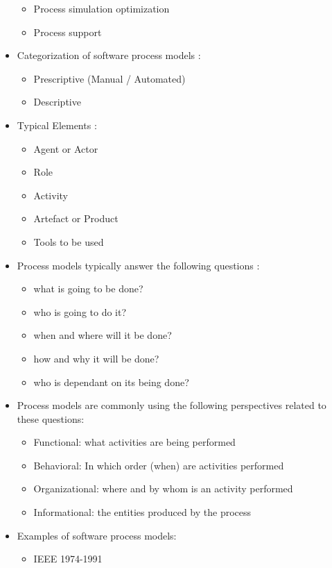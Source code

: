 \begin{itemize}
\begin{itemize}
		\item Process simulation  optimization
		\item Process support
	\end{itemize}
	\item Categorization of software process models \citep{McChesney:1995aa}:
	\begin{itemize}
		\item Prescriptive (Manual / Automated)
		\item Descriptive
	\end{itemize}
	\item Typical Elements \citep{Benali:1992gq} \citep{Acuna:2001aa} \citep{Fuggetta:2000ds} \citep{Curtis:1992kf}:
	\begin{itemize}
		\item Agent or Actor
		\item Role
		\item Activity
		\item Artefact or Product
		\item Tools to be used
	\end{itemize}
	\item Process models typically answer the following questions \citep{Curtis:1992kf}:
	\begin{itemize}
		\item what is going to be done?
		\item who is going to do it?
		\item when and where will it be done?
		\item how and why it will be done?
		\item who is dependant on its being done?
	\end{itemize}
	\item Process models are commonly using the following perspectives related to these questions:
	\begin{itemize}
		\item Functional: what activities are being performed
		\item Behavioral: In which order (when) are activities performed
		\item Organizational: where and by whom is an activity performed
		\item Informational: the entities produced by the process
	\end{itemize}
	\item Examples of software process models:
	\begin{itemize}
		\item IEEE 1974-1991

\end{itemize}
\end{itemize}
